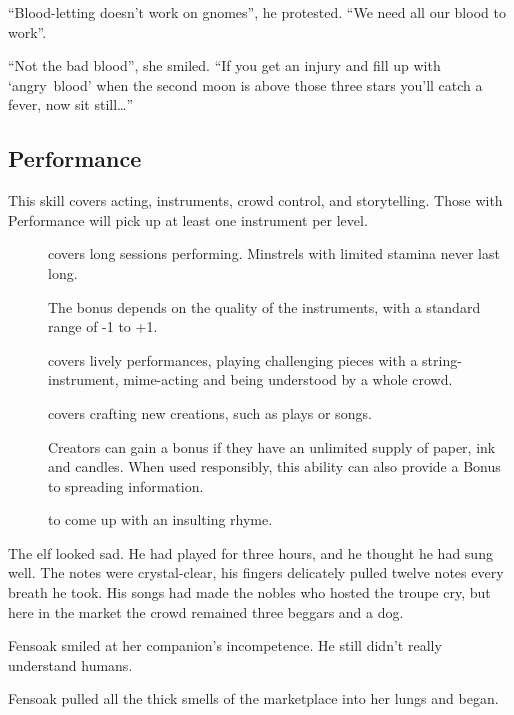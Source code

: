 \begin{multicols}{2}
\begin{exampletext}
  ``Blood-letting doesn't work on gnomes'', he protested.
  ``We need all our blood to work''.

  ``Not the bad blood'', she smiled.
  ``If you get an injury and fill up with `angry~blood' when the second moon is above those three stars you'll catch a fever, now sit still\ldots''
\end{exampletext}

\subsection{Performance}

This skill covers acting, instruments, crowd control, and storytelling.
Those with Performance will pick up at least one instrument per level.

\begin{description}
  \item[]
    covers long sessions performing.
    Minstrels with limited stamina never last long.

    The bonus depends on the quality of the instruments, with a standard range of -1 to +1.
  \item[]
    covers lively performances, playing challenging pieces with a string-instrument, mime-acting and being understood by a whole crowd.
  \item[]
    covers crafting new creations, such as plays or songs.

    Creators can gain a bonus if they have an unlimited supply of paper, ink and candles.
    When used responsibly, this ability can also provide a Bonus to spreading information.
  \item[]
    to come up with an insulting rhyme.
\end{description}

\begin{exampletext}
  The elf looked sad.
  He had played for three hours, and he thought he had sung well.
  The notes were crystal-clear, his fingers delicately pulled twelve notes every breath he took.
  His songs had made the nobles who hosted the troupe cry, but here in the market the crowd remained three beggars and a dog.

  Fensoak smiled at her companion's incompetence.
  He still didn't really understand humans.

  Fensoak pulled all the thick smells of the marketplace into her lungs and began.


\end{exampletext}
\end{multicols}
